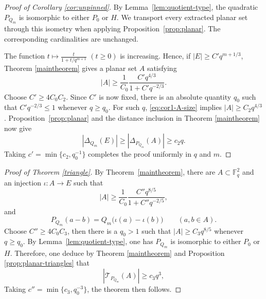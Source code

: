 \documentclass[11pt]{article}
\newcommand{\F}{\mathbb F}
\begin{document}
\begin{proof} [Proof of Corollary \ref{cor:unpinned}]
By Lemma~\ref{lem:quotient-type}, the quadratic $P_{Q_m}$ is isomorphic to either $P_0$ or $H$. We transport every extracted planar set through this isometry when applying Proposition~\ref{prop:planar}. The corresponding cardinalities are unchanged.

The function $t\longmapsto\frac{t}{1+t/q^{m+1}}$ $(t\geq 0)$ is increasing.  Hence, if $|E|\ge C'q^{m+1/3}$, Theorem \ref{maintheorem} gives a planar set $A$ satisfying
\begin{equation} \label{eq:cor1-A-size}
|A|\ge \frac1{C_0} \frac{C'q^{4/3}}{1+C'q^{-2/3}}.
\end{equation}
Choose $C'\ge4C_0C_2$. Since $C'$ is now fixed, there is an absolute quantity $q_0$ such that $C'q^{-2/3}\le1$ whenever $q\ge q_0$. For such $q$, \eqref{eq:cor1-A-size} implies $|A|\ge C_2q^{4/3}$. Proposition~\ref{prop:planar} and the distance inclusion in Theorem \ref{maintheorem} now give
\[
|\Delta_{Q_m}(E)| \ge|\Delta_{P_{Q_m}}(A)| \ge c_2q.
\]
Taking $c'=\min\{c_2,q_0^{-1}\}$ completes the proof uniformly in $q$ and $m$.
\end{proof}





\begin{proof}[Proof of Theorem \ref{triangle}]
 By
 Theorem~\ref{maintheorem}, there are $A\subset\F_q^2$ and an
 injection $\iota:A\to E$ such that
 \begin{equation} \label{eq:triangle-extracted-size}
|A| \ge \frac1{C_0} \frac{C'' q^{8/5}}{1+C''q^{-2/5}},
 \end{equation}
 and
 \begin{equation}
  \label{eq:triangle-extracted-isometry}
  P_{Q_m}(a-b)
  =Q_m\bigl(\iota(a)-\iota(b)\bigr)
  \qquad(a,b\in A).
 \end{equation}
Choose $C''\geq 4C_0C_3$, then there is a $q_0>1$ such that $|A|\geq C_3q^{8/5}$ whenever $q\geq q_0$. 
By Lemma~\ref{lem:quotient-type}, one has $P_{Q_m}$ is isomorphic to either $P_0$ or $H$. Therefore, one deduce by Theorem \ref{maintheorem} and Proposition \ref{prop:planar-triangles} that 
 \[ |\mathcal{T}_{P_{Q_m}}(A)|\geq c_3 q^3,\] 
Taking $c''=\min\{c_3,q_0^{-3}\}$, the theorem then follows. 
\end{proof}
\end{document}
